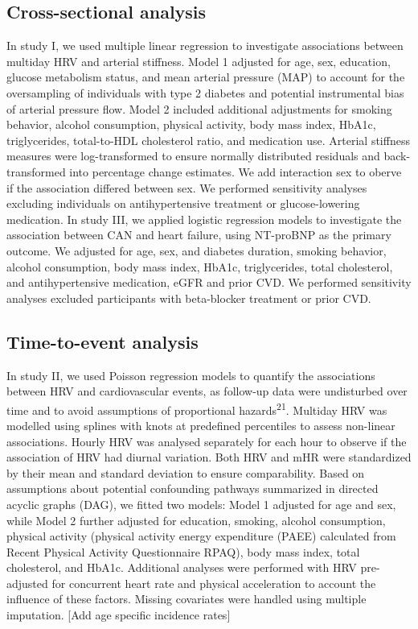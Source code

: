\documentclass[
  a4paper,
  headsepline=true,
  open=any]{scrbook}
\begin{document}
\hypertarget{cross-sectional-analysis}{%
\subsection{Cross-sectional analysis}\label{cross-sectional-analysis}}

In study I, we used multiple linear regression to investigate
associations between multiday HRV and arterial stiffness. Model 1
adjusted for age, sex, education, glucose metabolism status, and mean
arterial pressure (MAP) to account for the oversampling of individuals
with type 2 diabetes and potential instrumental bias of arterial
pressure flow. Model 2 included additional adjustments for smoking
behavior, alcohol consumption, physical activity, body mass index,
HbA1c, triglycerides, total-to-HDL cholesterol ratio, and medication
use. Arterial stiffness measures were log-transformed to ensure normally
distributed residuals and back-transformed into percentage change
estimates. We add interaction sex to oberve if the association differed
between sex. We performed sensitivity analyses excluding individuals on
antihypertensive treatment or glucose-lowering medication. In study III,
we applied logistic regression models to investigate the association
between CAN and heart failure, using NT-proBNP as the primary outcome.
We adjusted for age, sex, and diabetes duration, smoking behavior,
alcohol consumption, body mass index, HbA1c, triglycerides, total
cholesterol, and antihypertensive medication, eGFR and prior CVD. We
performed sensitivity analyses excluded participants with beta-blocker
treatment or prior CVD.

\hypertarget{time-to-event-analysis}{%
\subsection{Time-to-event analysis}\label{time-to-event-analysis}}

In study II, we used Poisson regression models to quantify the
associations between HRV and cardiovascular events, as follow-up data
were undisturbed over time and to avoid assumptions of proportional
hazards\textsuperscript{21}. Multiday HRV was modelled using splines
with knots at predefined percentiles to assess non-linear associations.
Hourly HRV was analysed separately for each hour to observe if the
association of HRV had diurnal variation. Both HRV and mHR were
standardized by their mean and standard deviation to ensure
comparability. Based on assumptions about potential confounding pathways
summarized in directed acyclic graphs (DAG), we fitted two models: Model
1 adjusted for age and sex, while Model 2 further adjusted for
education, smoking, alcohol consumption, physical activity (physical
activity energy expenditure (PAEE) calculated from Recent Physical
Activity Questionnaire RPAQ), body mass index, total cholesterol, and
HbA1c. Additional analyses were performed with HRV pre-adjusted for
concurrent heart rate and physical acceleration to account the influence
of these factors. Missing covariates were handled using multiple
imputation. {[}Add age specific incidence rates{]}
\end{document}
